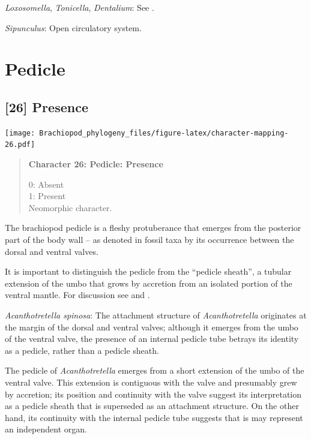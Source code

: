 \documentclass[openany]{book}
\begin{document}
\hypertarget{Dentalium-coding-25}{}
\emph{Loxosomella}, \emph{Tonicella}, \emph{Dentalium}: See
\citet{Haszprunar2008}.

\hypertarget{Sipunculus-coding-25}{}
\emph{Sipunculus}: Open circulatory system.

\section{Pedicle}\label{pedicle}

\subsection*{{[}26{]} Presence}\label{presence}

\texttt{[image: Brachiopod\_phylogeny\_files/figure-latex/character-mapping-26.pdf]}

\begin{quote}
\textbf{Character 26: Pedicle: Presence}

0: Absent\\
1: Present\\
Neomorphic character.
\end{quote}

The brachiopod pedicle is a fleshy protuberance that emerges from the
posterior part of the body wall -- as denoted in fossil taxa by its
occurrence between the dorsal and ventral valves.

It is important to distinguish the pedicle from the ``pedicle sheath'',
a tubular extension of the umbo that grows by accretion from an isolated
portion of the ventral mantle. For discussion see
\citet{Holmer2018Theattachment} and \citet{Bassett2017Earliestontogeny}.

\hypertarget{Acanthotretella_spinosa-coding-26}{}
\emph{Acanthotretella spinosa}: The attachment structure of
\emph{Acanthotretella} originates at the margin of the dorsal and
ventral valves; although it emerges from the umbo of the ventral valve,
the presence of an internal pedicle tube betrays its identity as a
pedicle, rather than a pedicle sheath.

The pedicle of \emph{Acanthotretella} emerges from a short extension of
the umbo of the ventral valve. This extension is contiguous with the
valve and presumably grew by accretion; its position and continuity with
the valve suggest its interpretation as a pedicle sheath that is
superseded as an attachment structure. On the other hand, its continuity
with the internal pedicle tube suggests that is may represent an
independent organ.
\end{document}
